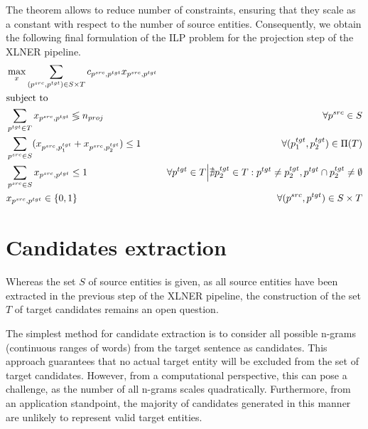 The theorem allows to reduce number of constraints, ensuring that they scale as a constant
with respect to the number of source entities. Consequently, we obtain the following final
formulation of the ILP problem for the projection step of the XLNER pipeline.
\begin{equation} \label{eq:ilp}
  \begin{aligned}
    & \max\limits_x \sum\limits_{(p^{src}, p^{tgt}) \in S \times T} c_{p^{src}, p^{tgt}} x_{p^{src}, p^{tgt}}                                                                                                                       \\
    & \text{subject to}                                                                                                                                                                                                             \\
    & \sum\limits_{p^{tgt} \in T} x_{p^{src}, p^{tgt}} \lessgtr n_{proj}                                      & \forall p^{src} \in S                                                                                               \\
    & \sum\limits_{p^{src} \in S} (x_{p^{src}, p_1^{tgt}} + x_{p^{src}, p_2^{tgt}}) \leq 1                    & \forall (p_1^{tgt}, p_2^{tgt}) \in \Pi(T)                                                                           \\
    & \sum\limits_{p^{src} \in S} x_{p^{src}, p^{tgt}} \leq 1                                                 & \forall p^{tgt} \in T \Big| \nexists p_2^{tgt} \in T: p^{tgt} \neq p_2^{tgt}, p^{tgt} \cap p_2^{tgt} \neq \emptyset \\
    & x_{p^{src}, p^{tgt}} \in \{ 0, 1 \}                                                                     & \forall (p^{src}, p^{tgt}) \in S \times T
  \end{aligned}
\end{equation}

\section{Candidates extraction}
Whereas the set \( S \) of source entities is given, as all source entities have been
extracted in the previous step of the XLNER pipeline, the construction of the set
\( T \) of target candidates remains an open question.

The simplest method for candidate extraction is to consider all possible n-grams
(continuous ranges of words) from the target sentence as candidates. This approach
guarantees that no actual target entity will be excluded from the set of target
candidates. However, from a computational perspective, this can pose a challenge,
as the number of all n-grams scales quadratically. Furthermore, from an application
standpoint, the majority of candidates generated in this manner are unlikely to
represent valid target entities.

